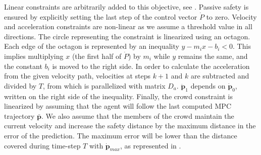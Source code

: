 \documentclass[letterpaper,conference,10pt]{IEEEconf}
\begin{document}
Linear constraints are arbitrarily added to this objective, see . Passive safety is ensured by explicitly setting the last step of the control vector $\dot{P}$ to zero. Velocity and acceleration constraints are non-linear as we assume a threshold value in all directions. The circle representing the constraint is linearized using an octagon. Each edge of the octagon is represented by an inequality $y - m_ix-b_i<0$. This implies multiplying $x$ (the first half of $\dot{P}$) by $m_i$ while $y$ remains the same, and the constant $b_i$ is moved to the right side. In order to calculate the acceleration from the given velocity path, velocities at steps $k+1$ and $k$ are subtracted and divided by $T$, from  which is parallelized with matrix $D_a$. $\ddot{\boldsymbol{p}}_1$  depends on $\dot{\boldsymbol{p}}_0$, written on the right side of the inequality. Finally, the crowd constraint is linearized by assuming that the agent will follow the last computed MPC trajectory $\boldsymbol{\bar{p}}$. We also assume that the members of the crowd maintain the current velocity and increase the safety distance by the maximum distance in the error of the prediction. The maximum error will be lower than the distance covered during time-step $T$ with $\dot{\boldsymbol{p}}_{max}$, as represented in .
\end{document}
